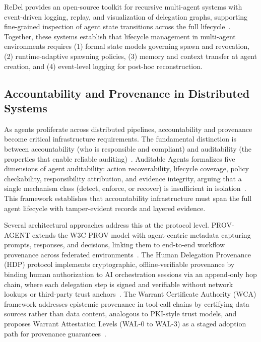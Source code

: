 ReDel provides an open-source toolkit for recursive multi-agent systems with event-driven logging, replay, and visualization of delegation graphs, supporting fine-grained inspection of agent state transitions across the full lifecycle~\cite{redel}. Together, these systems establish that lifecycle management in multi-agent environments requires (1) formal state models governing spawn and revocation, (2) runtime-adaptive spawning policies, (3) memory and context transfer at agent creation, and (4) event-level logging for post-hoc reconstruction.

\subsection{Accountability and Provenance in Distributed Systems}

As agents proliferate across distributed pipelines, accountability and provenance become critical infrastructure requirements. The fundamental distinction is between accountability (who is responsible and compliant) and auditability (the properties that enable reliable auditing)~\cite{auditable-agents}. Auditable Agents formalizes five dimensions of agent auditability: action recoverability, lifecycle coverage, policy checkability, responsibility attribution, and evidence integrity, arguing that a single mechanism class (detect, enforce, or recover) is insufficient in isolation~\cite{auditable-agents}. This framework establishes that accountability infrastructure must span the full agent lifecycle with tamper-evident records and layered evidence.

Several architectural approaches address this at the protocol level. PROV-AGENT extends the W3C PROV model with agent-centric metadata capturing prompts, responses, and decisions, linking them to end-to-end workflow provenance across federated environments~\cite{prov-agent}. The Human Delegation Provenance (HDP) protocol implements cryptographic, offline-verifiable provenance by binding human authorization to AI orchestration sessions via an append-only hop chain, where each delegation step is signed and verifiable without network lookups or third-party trust anchors~\cite{hdp-protocol}. The Warrant Certificate Authority (WCA) framework addresses epistemic provenance in tool-call chains by certifying data sources rather than data content, analogous to PKI-style trust models, and proposes Warrant Attestation Levels (WAL-0 to WAL-3) as a staged adoption path for provenance guarantees~\cite{wca}.

